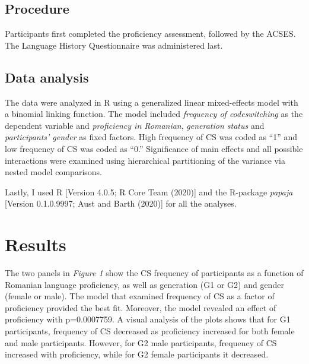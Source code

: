 \documentclass[
  english,
  man]{apa6}
\begin{document}
\hypertarget{procedure}{%
\subsection{Procedure}\label{procedure}}

Participants first completed the proficiency assessment, followed by the ACSES. The Language History Questionnaire was administered last.

\hypertarget{data-analysis}{%
\subsection{Data analysis}\label{data-analysis}}

The data were analyzed in R using a generalized linear mixed-effects model with a binomial linking function. The model included \emph{frequency of codeswitching} as the dependent variable and \emph{proficiency in Romanian}, \emph{generation status} and \emph{participants' gender} as fixed factors. High frequency of CS was coded as ``1'' and low frequency of CS was coded as ``0.'' Significance of main effects and all possible interactions were examined using hierarchical partitioning of the variance via nested model comparisons.

Lastly, I used R {[}Version 4.0.5; R Core Team (2020){]} and the R-package \emph{papaja} {[}Version 0.1.0.9997; Aust and Barth (2020){]} for all the analyses.

\hypertarget{results}{%
\section{Results}\label{results}}

The two panels in \emph{Figure 1} show the CS frequency of participants as a function of Romanian language proficiency, as well as generation (G1 or G2) and gender (female or male).
The model that examined frequency of CS as a factor of proficiency provided the best fit. Moreover, the model revealed an effect of proficiency with p=0.0007759.
A visual analysis of the plots shows that for G1 participants, frequency of CS decreased as proficiency increased for both female and male participants. However, for G2 male participants, frequency of CS increased with proficiency, while for G2 female participants it decreased.
\end{document}
